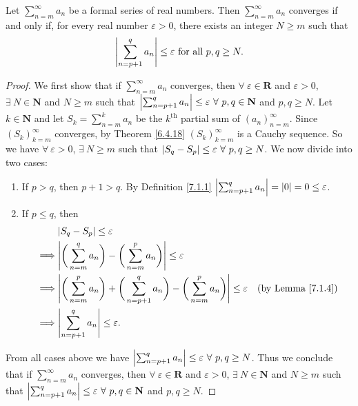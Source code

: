 \setcounter{theorem}{4}
\begin{proposition}\label{7.2.5}
    Let \(\sum_{n = m}^\infty a_n\) be a formal series of real numbers.
    Then \(\sum_{n = m}^\infty a_n\) converges if and only if, for every real number \(\varepsilon > 0\), there exists an integer \(N \geq m\) such that
    \[
        \abs*{\sum_{n = p + 1}^q a_n} \leq \varepsilon \text{ for all } p, q \geq N.
    \]
\end{proposition}

\begin{proof}
    We first show that if \(\sum_{n = m}^\infty a_n\) converges, then \(\forall\ \varepsilon \in \mathbf{R}\) and \(\varepsilon > 0\), \(\exists\ N \in \mathbf{N}\) and \(N \geq m\) such that \(\abs*{\sum_{n = p + 1}^q a_n} \leq \varepsilon \ \forall\ p, q \in \mathbf{N}\) and \(p, q \geq N\).
    Let \(k \in \mathbf{N}\) and let \(S_k = \sum_{n = m}^k a_n\) be the \(k^{\text{th}}\) partial sum of \((a_n)_{n = m}^\infty\).
    Since \((S_k)_{k = m}^\infty\) converges, by Theorem \ref{6.4.18} \((S_k)_{k = m}^\infty\) is a Cauchy sequence.
    So we have \(\forall\ \varepsilon > 0\), \(\exists\ N \geq m\) such that \(\abs*{S_q - S_p} \leq \varepsilon \ \forall\ p, q \geq N\).
    We now divide into two cases:
    \begin{enumerate}
        \item If \(p > q\), then \(p + 1 > q\).
              By Definition \ref{7.1.1} \(\abs*{\sum_{n = p + 1}^q a_n} = \abs*{0} = 0 \leq \varepsilon\).
        \item If \(p \leq q\), then
              \begin{align*}
                           & \abs*{S_q - S_p} \leq \varepsilon                                                                                                                            \\
                  \implies & \abs*{\bigg(\sum_{n = m}^q a_n\bigg) - \bigg(\sum_{n = m}^p a_n\bigg)} \leq \varepsilon                                                                      \\
                  \implies & \abs*{\bigg(\sum_{n = m}^p a_n\bigg) + \bigg(\sum_{n = p + 1}^q a_n\bigg) - \bigg(\sum_{n = m}^p a_n\bigg)} \leq \varepsilon & \text{(by Lemma \ref{7.1.4})} \\
                  \implies & \abs*{\sum_{n = p + 1}^q a_n} \leq \varepsilon.
              \end{align*}
    \end{enumerate}
    From all cases above we have \(\abs*{\sum_{n = p + 1}^q a_n} \leq \varepsilon \ \forall\ p, q \geq N\).
    Thus we conclude that if \(\sum_{n = m}^\infty a_n\) converges, then \(\forall\ \varepsilon \in \mathbf{R}\) and \(\varepsilon > 0\), \(\exists\ N \in \mathbf{N}\) and \(N \geq m\) such that \(\abs*{\sum_{n = p + 1}^q a_n} \leq \varepsilon \ \forall\ p, q \in \mathbf{N}\) and \(p, q \geq N\).


\end{proof}
